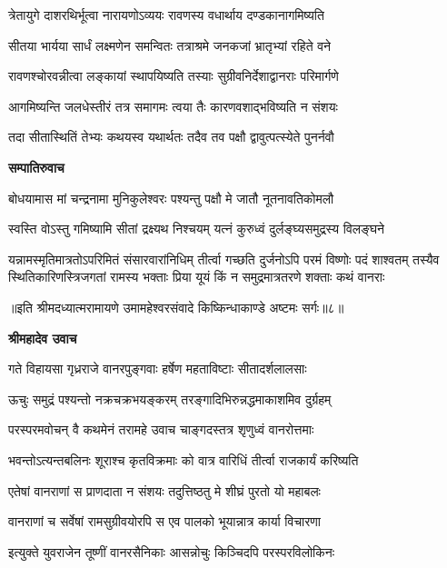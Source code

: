 \twolineshloka
{त्रेतायुगे दाशरथिर्भूत्वा नारायणोऽव्ययः}
{रावणस्य वधार्थाय दण्डकानागमिष्यति} %

\twolineshloka
{सीतया भार्यया सार्धं लक्ष्मणेन समन्वितः}
{तत्राश्रमे जनकजां भ्रातृभ्यां रहिते वने} %

\twolineshloka
{रावणश्चोरवन्नीत्वा लङ्कायां स्थापयिष्यति}
{तस्याः सुग्रीवनिर्देशाद्वानराः परिमार्गणे} %

\twolineshloka
{आगमिष्यन्ति जलधेस्तीरं तत्र समागमः}
{त्वया तैः कारणवशाद्भविष्यति न संशयः} %

\twolineshloka
{तदा सीतास्थितिं तेभ्यः कथयस्व यथार्थतः}
{तदैव तव पक्षौ द्वावुत्पत्स्येते पुनर्नवौ} %

\textbf{सम्पातिरुवाच}

\twolineshloka
{बोधयामास मां चन्द्रनामा मुनिकुलेश्वरः}
{पश्यन्तु पक्षौ मे जातौ नूतनावतिकोमलौ} %

\twolineshloka
{स्वस्ति वोऽस्तु गमिष्यामि सीतां द्रक्ष्यथ निश्चयम्}
{यत्नं कुरुध्वं दुर्लङ्घ्यसमुद्रस्य विलङ्घने} %

\fourlineindentedshloka
{यन्नामस्मृतिमात्रतोऽपरिमितं संसारवारांनिधिम्}
{तीर्त्वा गच्छति दुर्जनोऽपि परमं विष्णोः पदं शाश्वतम्}
{तस्यैव स्थितिकारिणस्त्रिजगतां रामस्य भक्ताः प्रिया}
{यूयं किं न समुद्रमात्रतरणे शक्ताः कथं वानराः} %

{॥इति श्रीमदध्यात्मरामायणे उमामहेश्वरसंवादे किष्किन्धाकाण्डे
अष्टमः सर्गः॥८॥
}




\textbf{श्रीमहादेव उवाच}

\twolineshloka
{गते विहायसा गृध्रराजे वानरपुङ्गवाः}
{हर्षेण महताविष्टाः सीतादर्शलालसाः} %

\twolineshloka
{ऊचुः समुद्रं पश्यन्तो नक्रचक्रभयङ्करम्}
{तरङ्गादिभिरुन्नद्धमाकाशमिव दुर्ग्रहम्} %

\twolineshloka
{परस्परमवोचन् वै कथमेनं तरामहे}
{उवाच चाङ्गदस्तत्र शृणुध्वं वानरोत्तमाः} %

\twolineshloka
{भवन्तोऽत्यन्तबलिनः शूराश्च कृतविक्रमाः}
{को वात्र वारिधिं तीर्त्वा राजकार्यं करिष्यति} %

\twolineshloka
{एतेषां वानराणां स प्राणदाता न संशयः}
{तदुत्तिष्ठतु मे शीघ्रं पुरतो यो महाबलः} %

\twolineshloka
{वानराणां च सर्वेषां रामसुग्रीवयोरपि}
{स एव पालको भूयान्नात्र कार्या विचारणा} %

\twolineshloka
{इत्युक्ते युवराजेन तूष्णीं वानरसैनिकाः}
{आसन्नोचुः किञ्चिदपि परस्परविलोकिनः} %

